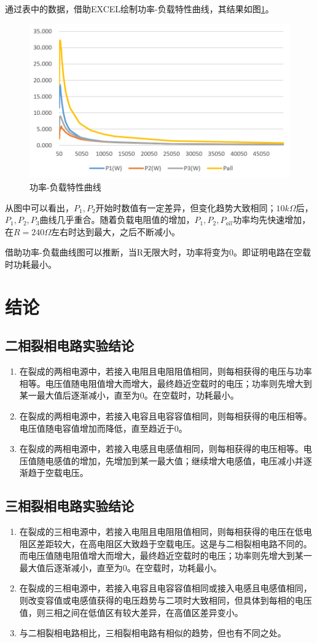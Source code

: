 \documentclass[12pt]{article}%
\begin{document}
通过表中的数据，借助EXCEL绘制功率-负载特性曲线，其结果如图\ref{fig:a121xss}。
\begin{figure}[htbp]
\centering\includegraphics[width=0.8\linewidth]{TIM20180531233316.png}
\caption{\heiti{}功率-负载特性曲线}\label{fig:a121xss}
\end{figure}
从图中可以看出，$P_1,P_2$开始时数值有一定差异，但变化趋势大致相同；$10k\Omega$后，$P_1,P_2,P_3$曲线几乎重合。随着负载电阻值的增加，$P_1,P_2,P_{all}$功率均先快速增加，在$R=240\Omega$左右时达到最大，之后不断减小。

借助功率-负载曲线图可以推断，当R无限大时，功率将变为0。即证明电路在空载时功耗最小。
\section{结论}
\subsection{二相裂相电路实验结论}
\begin{enumerate}[(1).]
\item 在裂成的两相电源中，若接入电阻且电阻阻值相同，则每相获得的电压与功率相等。电压值随电阻值增大而增大，最终趋近空载时的电压；功率则先增大到某一最大值后逐渐减小，直至为0。在空载时，功耗最小。
\item 在裂成的两相电源中，若接入电容且电容容值相同，则每相获得的电压相等。电压值随电容值增加而降低，直至趋近于0。
\item 在裂成的两相电源中，若接入电感且电感值相同，则每相获得的电压相等。电压值随电感值的增加，先增加到某一最大值；继续增大电感值，电压减小并逐渐趋于空载电压。
\end{enumerate}
\subsection{三相裂相电路实验结论}
\begin{enumerate}[(1).]
\item 在裂成的三相电源中，若接入电阻且电阻阻值相同，则每相获得的电压在低电阻区差距较大，在高电阻区大致趋于空载电压。这是与二相裂相电路不同的。而电压值随电阻值增大而增大，最终趋近空载时的电压；功率则先增大到某一最大值后逐渐减小，直至为0。在空载时，功耗最小。
\item 在裂成的三相电源中，若接入电容且电容容值相同或接入电感且电感值相同，则改变容值或电感值获得的电压趋势与二项时大致相同，但具体到每相的电压值，则三相之间在低值区有较大差异，在高值区差异变小。
\item 与二相裂相电路相比，三相裂相电路有相似的趋势，但也有不同之处。
\end{enumerate}
\end{document}
